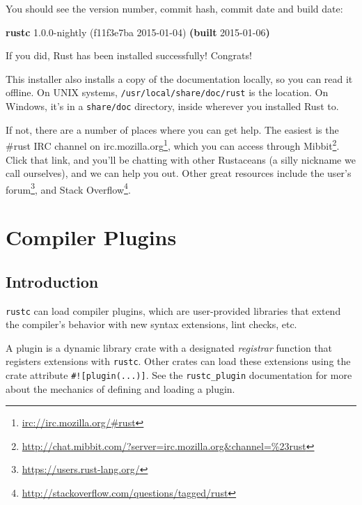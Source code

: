 \documentclass[a4paper,]{book}
\newenvironment{Shaded}{\begin{snugshade}}{\end{snugshade}}
\newcommand{\KeywordTok}[1]{\textcolor[rgb]{0.13,0.29,0.53}{\textbf{{#1}}}}
\newcommand{\NormalTok}[1]{{#1}}
\renewcommand{\href}[2]{#2\footnote{\url{#1}}}
\begin{document}
You should see the version number, commit hash, commit date and build
date:

\begin{Shaded}
\begin{Highlighting}[]
\KeywordTok{rustc} \NormalTok{1.0.0-nightly (f11f3e7ba 2015-01-04) }\KeywordTok{(built} \NormalTok{2015-01-06}\KeywordTok{)}
\end{Highlighting}
\end{Shaded}

If you did, Rust has been installed successfully! Congrats!

This installer also installs a copy of the documentation locally, so you
can read it offline. On UNIX systems, \texttt{/usr/local/share/doc/rust}
is the location. On Windows, it's in a \texttt{share/doc} directory,
inside wherever you installed Rust to.

If not, there are a number of places where you can get help. The easiest
is \href{irc://irc.mozilla.org/\#rust}{the \#rust IRC channel on
irc.mozilla.org}, which you can access through
\href{http://chat.mibbit.com/?server=irc.mozilla.org\&channel=\%23rust}{Mibbit}.
Click that link, and you'll be chatting with other Rustaceans (a silly
nickname we call ourselves), and we can help you out. Other great
resources include \href{https://users.rust-lang.org/}{the user's forum},
and \href{http://stackoverflow.com/questions/tagged/rust}{Stack
Overflow}.

\hypertarget{sec--compiler-plugins}{\section{Compiler
Plugins}\label{sec--compiler-plugins}}

\subsection{Introduction}\label{introduction-2}

\texttt{rustc} can load compiler plugins, which are user-provided
libraries that extend the compiler's behavior with new syntax
extensions, lint checks, etc.

A plugin is a dynamic library crate with a designated \emph{registrar}
function that registers extensions with \texttt{rustc}. Other crates can
load these extensions using the crate attribute
\texttt{\#!{[}plugin(...){]}}. See the \texttt{rustc\_plugin}
documentation for more about the mechanics of defining and loading a
plugin.
\end{document}
